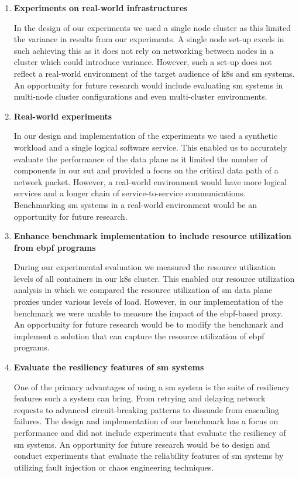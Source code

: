 \begin{enumerate}
    \item \textbf{Experiments on real-world infrastructures}
    
    In the design of our experiments we used a single node cluster as this limited the variance in results from our experiments. A single node set-up excels in such achieving this as it does not rely on networking between nodes in a cluster which could introduce variance. However, such a set-up does not reflect a real-world environment of the target audience of \gls{k8s} and \gls{sm} systems. An opportunity for future research would include evaluating \gls{sm} systems in multi-node cluster configurations and even multi-cluster environments.
    


    \item \textbf{Real-world experiments}
    
    In our design and implementation of the experiments we used a synthetic workload and a single logical software service. This enabled us to accurately evaluate the performance of the data plane as it limited the number of components in our \gls{sut} and provided a focus on the critical data path of a network packet. However, a real-world environment would have more logical services and a longer chain of service-to-service communications. Benchmarking \gls{sm} systems in a real-world environment would be an opportunity for future research. 

    
    \item \textbf{Enhance benchmark implementation to include resource utilization from \gls{ebpf} programs}
    
    During our experimental evaluation we measured the resource utilization levels of all containers in our \gls{k8s} cluster. This enabled our resource utilization analysis in which we compared the resource utilization of \gls{sm} data plane proxies under various levels of load. However, in our implementation of the benchmark we were unable to measure the impact of the \gls{ebpf}-based proxy. An opportunity for future research would be to modify the benchmark and implement a solution that can capture the resource utilization of \gls{ebpf} programs.
    
    \item \textbf{Evaluate the resiliency features of \gls{sm} systems}
    
    One of the primary advantages of using a \gls{sm} system is the suite of resiliency features such a system can bring. From retrying and delaying network requests to advanced circuit-breaking patterns to dissuade from cascading failures. The design and implementation of our benchmark has a focus on performance and did not include experiments that evaluate the resiliency of \gls{sm} systems. An opportunity for future research would be to design and conduct experiments that evaluate the reliability features of \gls{sm} systems by utilizing fault injection or chaos engineering techniques.
    

\end{enumerate}
